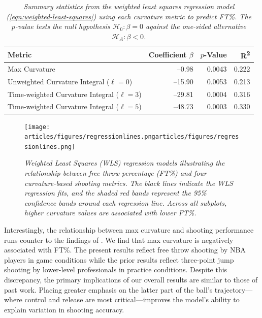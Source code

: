 \documentclass{article}
\begin{document}
    \begin{table}[H]
        \centering
        \begin{tabular}{lrrr}
        \toprule
        \textbf{Metric} & \textbf{Coefficient} $\beta$ & $p$-\textbf{Value} & \textbf{R\textsuperscript{2}}\\
        \midrule
        Max Curvature                               &   --0.98  & 0.0043  & 0.222 \\
        Unweighted Curvature Integral ($\ell=0$)    &  --15.90  & 0.0053  & 0.213 \\
        Time-weighted Curvature Integral ($\ell=3$) &  --29.81  & 0.0004  & 0.316 \\
        Time-weighted Curvature Integral ($\ell=5$) &  --48.73  & 0.0003  & 0.330 \\
        \bottomrule
        \end{tabular}
        \caption{\it Summary statistics from the weighted least squares regression model (\ref{eqn:weighted-least-squares}) using each curvature metric to predict FT\%. The $p$-value tests the null hypothesis $\mathcal{H}_0 : \beta = 0$ against the one-sided alternative $\mathcal{H}_A : \beta < 0$.}
        \label{tab:wls-results}
    \end{table}
    
    \begin{figure}[H]
        \centering
        \texttt{[image: articles/figures/regressionlines.pngarticles/figures/regressionlines.png]}
        \caption{\it Weighted Least Squares (WLS) regression models illustrating the relationship between free throw percentage (FT\%) and four curvature-based shooting metrics. The black lines indicate the WLS regression fits, and the shaded red bands represent the 95\% confidence bands around each regression line. Across all subplots, higher curvature values are associated with lower FT\%.}
        \label{fig:regressionlines}
    \end{figure}

    Interestingly, the relationship between max curvature and shooting performance runs counter to the findings of \citet{slegers_role_2024}. We find that max curvature is negatively associated with FT\%. The present results reflect free throw shooting by NBA players in game conditions while the prior results reflect three-point jump shooting by lower-level professionals in practice conditions. Despite this discrepancy, the primary implications of our overall results are similar to those of past work. Placing greater emphasis on the latter part of the ball's trajectory---where control and release are most critical---improves the model's ability to explain variation in shooting accuracy.
\end{document}

